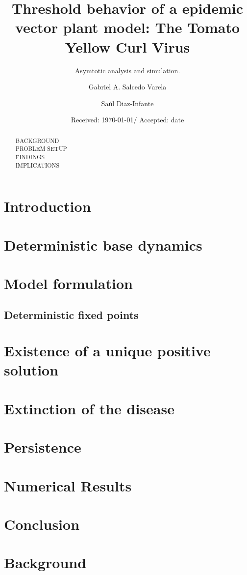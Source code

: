 \documentclass[smallextended]{svjour3}
\begin{document}
	\title{%
		Threshold behavior of a epidemic vector plant model:
		The Tomato Yellow Curl Virus
	}
	\subtitle{%
		Asymtotic analysis and simulation.
	}
	\author{Gabriel A. Salcedo Varela  \and Sa\'ul Diaz-Infante }
	\date{Received: \today / Accepted: date}
	\maketitle
	\begin{abstract}
		BACKGROUND
		\\
		PROBLEM SETUP
		\\
		FINDINGS 
		\\
		IMPLICATIONS
	\end{abstract}
	\section{Introduction}
	\section{Deterministic base dynamics}
		\label{sec:model_formulation}
		\section{Model formulation}
		
		\subsection{Deterministic fixed points}
			
	\section{Existence of a unique positive solution}
		\label{sec:solution_existence}
		
	\section{Extinction of the disease}
		\label{extinction}
		
		
	\section{Persistence}
		\label{sec:persistence}
		
	\section{Numerical Results}
		\label{sec:numerics}
	\section{Conclusion}
		\label{sec:conclusion}
	
	\appendix
	\section{Background}
\end{document}
